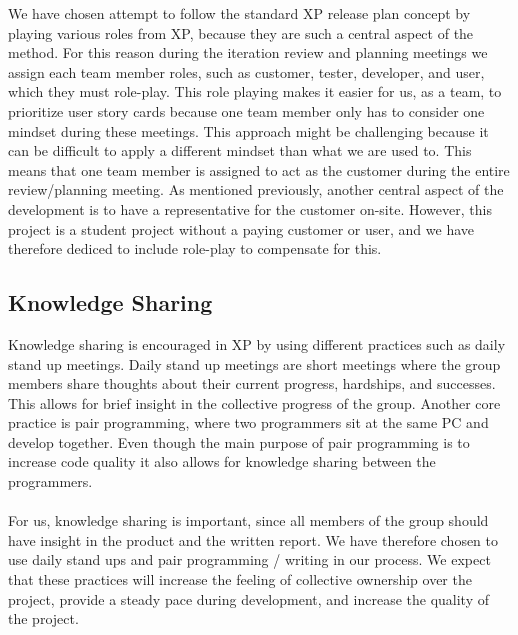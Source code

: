 We have chosen attempt to follow the standard XP release plan concept by playing various roles from XP, because they are such a central aspect of the method. For this reason during the iteration review and planning meetings we assign each team member roles, such as customer, tester, developer, and user, which they must role-play. This role playing makes it easier for us, as a team, to prioritize user story cards because one team member only has to consider one mindset during these meetings. This approach might be challenging because it can be difficult to apply a different mindset than what we are used to. This means that one team member is assigned to act as the customer during the entire review/planning meeting. As mentioned previously, another central aspect of the development is to have a representative for the customer on-site. However, this project is a student project without a paying customer or user, and we have therefore dediced to include role-play to compensate for this. 


\subsection{Knowledge Sharing}
\label{sub:knowledge_sharing}
Knowledge sharing is encouraged in XP by using different practices such as daily stand up meetings. Daily stand up meetings are short meetings where the group members share thoughts about their current progress, hardships, and successes. This allows for brief insight in the collective progress of the group. Another core practice is pair programming, where two programmers sit at the same PC and develop together. Even though the main purpose of pair programming is to increase code quality it also allows for knowledge sharing between the programmers. 
\\\\ 
For us, knowledge sharing is important, since all members of the group should have insight in the product and the written report. We have therefore chosen to use daily stand ups and pair programming / writing in our process. We expect that these practices will increase the feeling of collective ownership over the project, provide a steady pace during development, and increase the quality of the project. 

